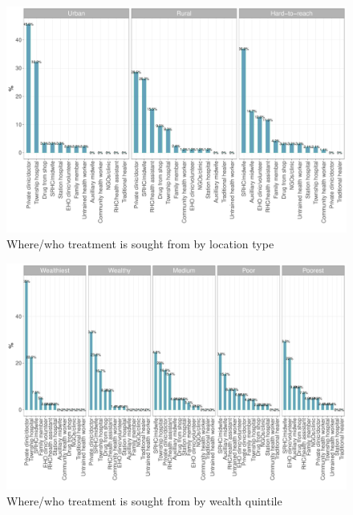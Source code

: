\documentclass[12pt,a4paper]{article}
\begin{document}
\begin{figure}[H]

{\centering \includegraphics{kayahReport_files/figure-latex/fever5plot-1} 

}

\caption{Where/who treatment is sought from by location type}\label{fig:fever5plot}
\end{figure}

\begin{figure}[H]

{\centering \includegraphics{kayahReport_files/figure-latex/fever6plot-1} 

}

\caption{Where/who treatment is sought from by wealth quintile}\label{fig:fever6plot}
\end{figure}
\end{document}
